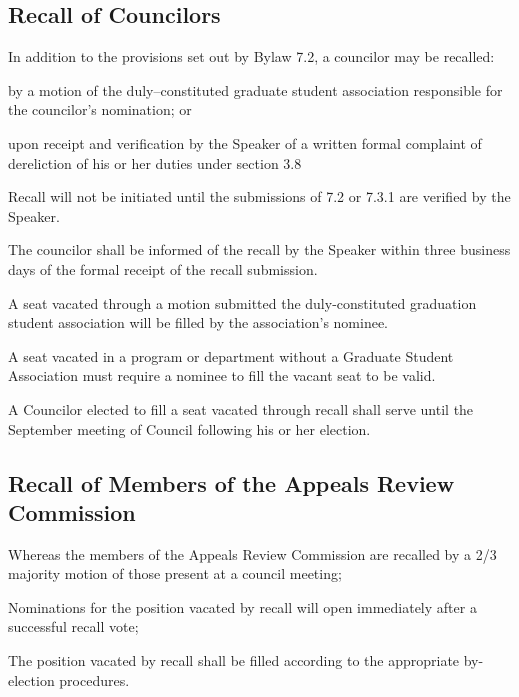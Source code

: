 \subsection {Recall of Councilors}
\begin{longenum}[ label*=\thesubsection.\arabic*., align=left]
	\item In addition to the provisions set out by Bylaw 7.2, a councilor may be recalled:
    \begin{longenum}[ label*=\arabic*., align=left]
		\item by a motion of the duly--constituted graduate student association responsible for the councilor's nomination; or
        \item upon receipt and verification by the Speaker of a written formal complaint of dereliction of his or her duties under section 3.8
	\end{longenum}
    \item Recall will not be initiated until the submissions of 7.2 or 7.3.1 are verified by the Speaker.
    \item The councilor shall be informed of the recall by the Speaker within three business days of the formal receipt of the recall submission.
    \item A seat vacated through a motion submitted the duly-constituted graduation student association will be filled by the association's nominee.
    \item A seat vacated in a program or department without a Graduate Student Association must require a nominee to fill the vacant seat to be valid. 
    \item A Councilor elected to fill a seat vacated through recall shall serve until the September meeting of Council following his or her election.
\end{longenum}

\subsection{Recall of Members of the Appeals Review Commission}
\begin{longenum}[ label*=\thesubsection.\arabic*., align=left]
	\item Whereas the members of the Appeals Review Commission are recalled by a 2/3 majority motion of those present at a council meeting;
    \item Nominations for the position vacated by recall will open immediately after a successful recall vote;
    \item The position vacated by recall shall be filled according to the appropriate by-election procedures.
\end{longenum}

